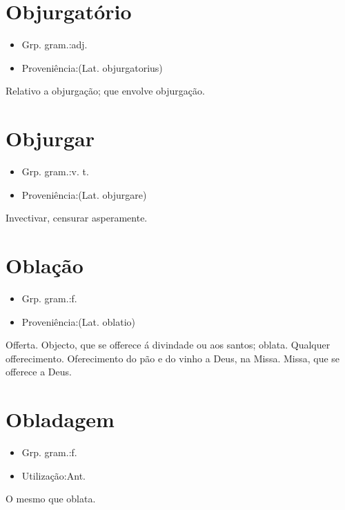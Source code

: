 \section{Objurgatório}
\begin{itemize}
\item {Grp. gram.:adj.}
\end{itemize}
\begin{itemize}
\item {Proveniência:(Lat. \textunderscore objurgatorius\textunderscore )}
\end{itemize}
Relativo a objurgação; que envolve objurgação.
\section{Objurgar}
\begin{itemize}
\item {Grp. gram.:v. t.}
\end{itemize}
\begin{itemize}
\item {Proveniência:(Lat. \textunderscore objurgare\textunderscore )}
\end{itemize}
Invectivar, censurar asperamente.
\section{Oblação}
\begin{itemize}
\item {Grp. gram.:f.}
\end{itemize}
\begin{itemize}
\item {Proveniência:(Lat. \textunderscore oblatio\textunderscore )}
\end{itemize}
Offerta.
Objecto, que se offerece á divindade ou aos santos; oblata.
Qualquer offerecimento.
Oferecimento do pão e do vinho a Deus, na Missa.
Missa, que se offerece a Deus.
\section{Obladagem}
\begin{itemize}
\item {Grp. gram.:f.}
\end{itemize}
\begin{itemize}
\item {Utilização:Ant.}
\end{itemize}
O mesmo que \textunderscore oblata\textunderscore .
